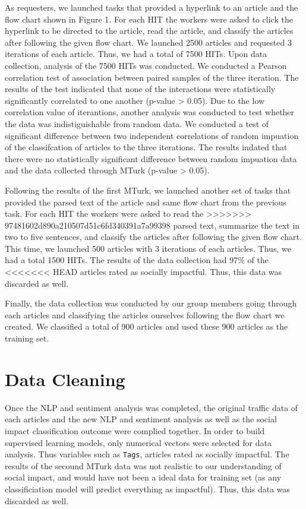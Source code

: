 \documentclass[10pt,letterpaper]{article}
\begin{document}
As requesters, we launched tasks that provided a hyperlink to an article
and the flow chart shown in Figure 1. For each HIT the workers were
asked to click the hyperlink to be directed to the article, read the
article, and classify the articles after following the given flow chart.
We launched 2500 articles and requested 3 iterations of each article.
Thus, we had a total of 7500 HITs. Upon data collection, analysis of the
7500 HITs was conducted. We conducted a Pearson correlation test of
association between paired samples of the three iteration. The results
of the test indicated that none of the interactions were statistically
significantly correlated to one another (p-value \textgreater{} 0.05).
Due to the low correlation value of iterantions, another analysis was
conducted to test whether the data was indistiguishable from random
data. We conducted a test of significant difference between two
independent correlations of random impuation of the classifcation of
articles to the three iterations. The results indated that there were no
statistically significant difference between random impuation data and
the data collected through MTurk (p-value \textgreater{} 0.05).

Following the results of the first MTurk, we launched another set of
tasks that provided the parsed text of the article and same flow chart
from the previous task. For each HIT the workers were asked to read the
>>>>>>> 97481602d890a210507d51c6fd340391a7a99398
parsed text, summarize the text in two to five sentences, and classify
the articles after following the given flow chart. This time, we
launched 500 articles with 3 iterations of each articles. Thus, we had a
total 1500 HITs. The results of the data collection had 97\% of the
<<<<<<< HEAD
articles rated as socially impactful. Thus, this data was discarded as
well.

Finally, the data collection was conducted by our group members going
through each articles and classifying the articles ourselves following
the flow chart we created. We classified a total of 900 articles and
used these 900 articles as the training set.

\section{Data Cleaning}\label{data-cleaning}

Once the NLP and sentiment analysis was completed, the original traffic
data of each articles and the new NLP and sentiment analysis as well as
the social impact classification outcome were complied together. In
order to build supervised learning models, only numerical vectors were
selected for data analysis. Thus variables such as \texttt{Tags},
articles rated as socially impactful. The results of the secound MTurk
data was not realistic to our understanding of social impact, and would
have not been a ideal data for training set (as any classificiation
model will predict everything as impactful). Thus, this data was
discarded as well.
\end{document}
